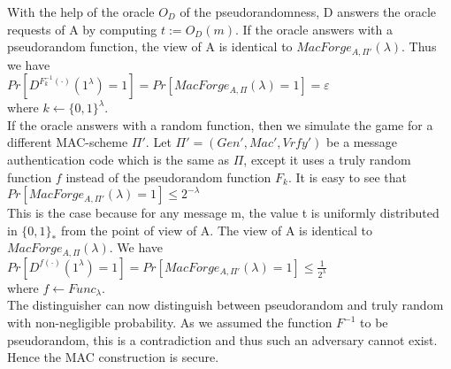 With the help of the oracle $O_{D}$ of the pseudorandomness, D answers the oracle requests of A by computing $t := O_{D}(m)$. If the oracle answers with a pseudorandom function, the view of A is identical to $MacForge_{A,\Pi'}(\lambda)$. Thus we have \\
$Pr\left [ D^{F_{k}^{-1}(\cdot )}(1^{\lambda }) = 1 \right ] = Pr\left [ MacForge_{A,\Pi}(\lambda ) = 1 \right ] = \varepsilon $\\
where $k \leftarrow  \{0,1\}^{\lambda }$.\\
If the oracle answers with a random function, then we simulate the game for a different MAC-scheme $\Pi'$.
Let $\Pi' = (Gen', Mac', Vrfy')$ be a message authentication code which is the same as $\Pi$, except it uses a truly random function $f$ instead of the pseudorandom function $F_{k}$. 
It is easy to see that \\
$Pr\left [ MacForge_{A,\Pi'}(\lambda ) = 1 \right ] \leq 2^{-\lambda } $\\
This is the case because for any message m, the value t is uniformly distributed in $\{0,1\}_{*}$ from the point of view of A. The view of A is identical to $MacForge_{A,\Pi}(\lambda )$. We have \\
$Pr\left [ D^{f(\cdot )}(1^{\lambda }) = 1 \right ] = Pr\left [ MacForge_{A,\Pi'}(\lambda ) = 1 \right ]  \leq \frac{1}{2^{\lambda }} $ \\
where $f \leftarrow Func_{\lambda }$.\\
The distinguisher can now distinguish between pseudorandom and truly random with non-negligible probability.
As we assumed the function $F^{-1}$ to be pseudorandom, this is a contradiction and thus such an adversary cannot exist. Hence the MAC construction is secure.



